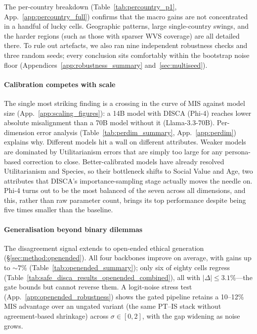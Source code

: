 \documentclass{article}
\begin{document}
The per-country breakdown (Table~\ref{tab:percountry_p1}, App.~\ref{app:percountry_full}) confirms that the macro gains are not concentrated in a handful of lucky cells. Geographic patterns, large single-country swings, and the harder regions (such as those with sparser WVS coverage) are all detailed there. To rule out artefacts, we also ran nine independent robustness checks and three random seeds; every conclusion sits comfortably within the bootstrap noise floor (Appendices~\ref{app:robustness_summary} and~\ref{sec:multiseed}).

\vspace{-0.2cm}
\paragraph{Calibration competes with scale}
\vspace{-0.2cm}

The single most striking finding is a crossing in the curve of MIS against model size (App.~\ref{app:scaling_figures}): a 14B model with DISCA (Phi-4) reaches lower absolute misalignment than a 70B model without it (Llama-3.3-70B). Per-dimension error analysis (Table~\ref{tab:perdim_summary}, App.~\ref{app:perdim}) explains why. Different models hit a wall on different attributes. Weaker models are dominated by Utilitarianism errors that are simply too large for any persona-based correction to close. Better-calibrated models have already resolved Utilitarianism and Species, so their bottleneck shifts to Social Value and Age, two attributes that DISCA's importance-sampling stage actually moves the needle on. Phi-4 turns out to be the most balanced of the seven across all dimensions, and this, rather than raw parameter count, brings its top performance despite being five times smaller than the baseline.

\vspace{-0.2cm}
\paragraph{Generalisation beyond binary dilemmas}
\label{sec:openended_main}
\vspace{-0.2cm}

The disagreement signal extends to open-ended ethical generation (\S\ref{sec:method:openended}). All four backbones improve on average, with gains up to ${\sim}7\%$ (Table~\ref{tab:openended_summary}); only six of eighty cells regress (Table~\ref{tab:safe_disca_results_openended_combined}), all with $|\Delta|\!\le\!3.1\%$---the gate bounds but cannot reverse them. A logit-noise stress test (App.~\ref{app:openended_robustness}) shows the gated pipeline retains a 10--12\% MIS advantage over an ungated variant (the same PT--IS stack without agreement-based shrinkage) across $\sigma \in [0,2]$, with the gap widening as noise grows.
\end{document}
